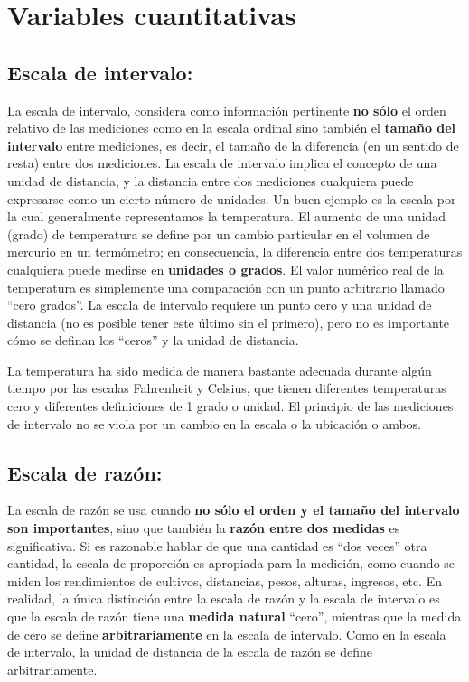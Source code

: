 \documentclass[
  a4paper,
  oneside,
  openany]{book}
\begin{document}
\hypertarget{variables-cuantitativas}{%
\section{Variables cuantitativas}\label{variables-cuantitativas}}

\hypertarget{escala-de-intervalo}{%
\subsection{Escala de intervalo:}\label{escala-de-intervalo}}

La escala de intervalo, considera como información pertinente \textbf{no sólo} el orden relativo de las mediciones como en la escala ordinal sino también el \textbf{tamaño del intervalo} entre mediciones, es decir, el tamaño de la diferencia (en un sentido de resta) entre dos mediciones. La escala de intervalo implica el concepto de una unidad de distancia, y la distancia entre dos mediciones cualquiera puede expresarse como un cierto número de unidades. Un buen ejemplo es la escala por la cual generalmente representamos la temperatura. El aumento de una unidad (grado) de temperatura se define por un cambio particular en el volumen de mercurio en un termómetro; en consecuencia, la diferencia entre dos temperaturas cualquiera puede medirse en \textbf{unidades o grados}. El valor numérico real de la temperatura es simplemente una comparación con un punto arbitrario llamado ``cero grados''. La escala de intervalo requiere un punto cero y una unidad de distancia (no es posible tener este último sin el primero), pero no es importante cómo se definan los ``ceros'' y la unidad de distancia.

La temperatura ha sido medida de manera bastante adecuada durante algún tiempo por las escalas Fahrenheit y Celsius, que tienen diferentes temperaturas cero y diferentes definiciones de 1 grado o unidad. El principio de las mediciones de intervalo no se viola por un cambio en la escala o la ubicación o ambos.

\hypertarget{escala-de-razuxf3n}{%
\subsection{Escala de razón:}\label{escala-de-razuxf3n}}

La escala de razón se usa cuando \textbf{no sólo el orden y el tamaño del intervalo son importantes}, sino que también la \textbf{razón entre dos medidas} es significativa. Si es razonable hablar de que una cantidad es ``dos veces'' otra cantidad, la escala de proporción es apropiada para la medición, como cuando se miden los rendimientos de cultivos, distancias, pesos, alturas, ingresos, etc. En realidad, la única distinción entre la escala de razón y la escala de intervalo es que la escala de razón tiene una \textbf{medida natural} ``cero'', mientras que la medida de cero se define \textbf{arbitrariamente} en la escala de intervalo. Como en la escala de intervalo, la unidad de distancia de la escala de razón se define arbitrariamente.
\end{document}
